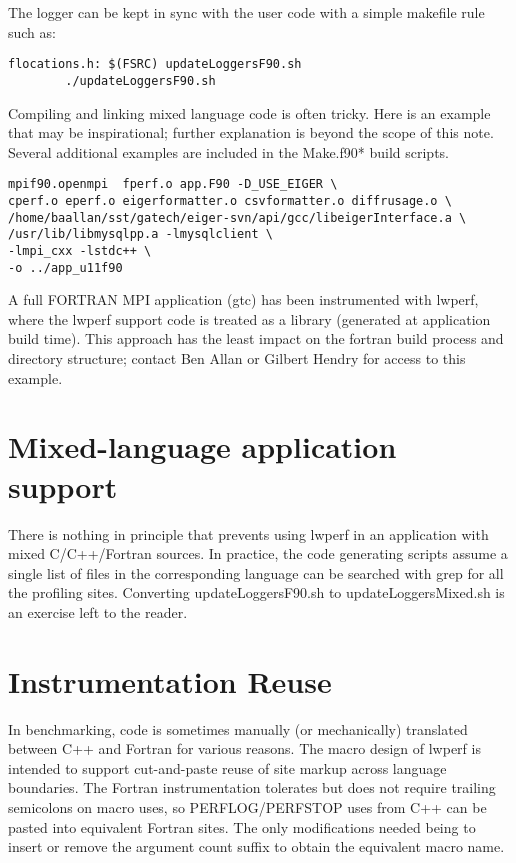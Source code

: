 \documentclass{article}
\begin{document}
The logger can be kept in sync with the user code with a simple makefile rule such as:
\begin{verbatim}
flocations.h: $(FSRC) updateLoggersF90.sh
        ./updateLoggersF90.sh
\end{verbatim}

Compiling and linking mixed language code is often tricky. Here is an example that may be inspirational; further explanation is beyond the scope of this note. Several additional examples are included in the Make.f90* build scripts.

\begin{verbatim}
mpif90.openmpi  fperf.o app.F90 -D_USE_EIGER \
cperf.o eperf.o eigerformatter.o csvformatter.o diffrusage.o \
/home/baallan/sst/gatech/eiger-svn/api/gcc/libeigerInterface.a \
/usr/lib/libmysqlpp.a -lmysqlclient \
-lmpi_cxx -lstdc++ \
-o ../app_u11f90
\end{verbatim}

A full FORTRAN MPI application (gtc) has been instrumented with lwperf, where the lwperf support code is treated as a library (generated at application build time). This approach has the least impact on the fortran build process and directory structure; contact Ben Allan or Gilbert Hendry for access to this example.


\section{Mixed-language application support}

There is nothing in principle that prevents using lwperf in an application with mixed C/C++/Fortran sources.
In practice, the code generating scripts assume a single list of files in the corresponding language can
be searched with grep for all the profiling sites. Converting updateLoggersF90.sh to updateLoggersMixed.sh
is an exercise left to the reader.

\section{Instrumentation Reuse}
\label{sec:reuse}
In benchmarking, code is sometimes manually (or mechanically) translated 
between C++ and Fortran for various reasons. The macro design of lwperf
is intended to support cut-and-paste reuse of site markup 
across language boundaries. The Fortran instrumentation tolerates but
does not require trailing semicolons on macro uses, so PERFLOG/PERFSTOP uses
from C++ can be pasted into equivalent Fortran sites. The only modifications
needed being to insert or remove the argument count suffix to obtain the equivalent macro name.
\end{document}
